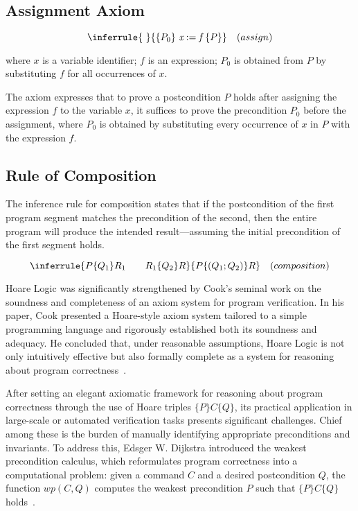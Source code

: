 \subsection{Assignment Axiom}

\[ 
  \inferrule
  { \ }
  {\{P_0\} \ \textit{x} := \textit{f} \ \{P\}}
  \quad (assign)
\]

where $x$ is a variable identifier; $f$ is an expression; $P_0$ is obtained from $P$ by substituting $f$ for all occurrences 
of $x$.

The axiom expresses that to prove a postcondition $P$ holds after assigning the expression $f$ to the variable $x$,
it suffices to prove the precondition $P_0$ before the assignment, where $P_0$ is obtained by substituting every occurrence of
$x$ in $P$ with the expression $f$.

\subsection{Rule of Composition}

The inference rule for composition states that if the postcondition of the first program segment matches the precondition 
of the second, then the entire program will produce the intended result—assuming the initial precondition of the first 
segment holds.

\[ 
  \inferrule
  {P \{ Q_1 \} R_1 \quad \quad  R_1 \{ Q_2 \} R}
  {P \{ (Q_1 ; Q_2) \} R} 
  \quad (composition)
\]

Hoare Logic was significantly strengthened by Cook's seminal work on the soundness and completeness of an axiom system 
for program verification. In his paper, Cook presented a Hoare-style axiom system tailored to a simple programming language 
and rigorously established both its soundness and adequacy. He concluded that, under reasonable assumptions, Hoare Logic is 
not only intuitively effective but also formally complete as a system for reasoning about program correctness~\cite{0207005}.

After setting an elegant axiomatic framework for reasoning about program correctness through the use of Hoare triples 
$\{P\}C\{Q\}$, its practical application in large-scale or automated verification tasks presents significant challenges. 
Chief among these is the burden of manually identifying appropriate preconditions and invariants. To address this, 
Edsger W. Dijkstra introduced the weakest precondition calculus, which reformulates program correctness into a computational 
problem: given a command $C$ and a desired postcondition $Q$, the function $wp(C,Q)$ computes the weakest precondition $P$ 
such that $\{P\}C\{Q\}$ holds~\cite{Dijkstra76}.

